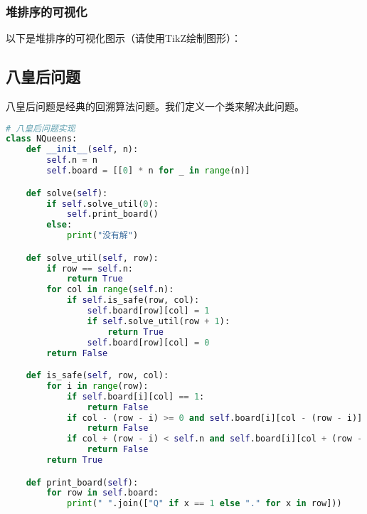 \documentclass{article}
\begin{document}
\subsubsection{堆排序的可视化}
以下是堆排序的可视化图示（请使用TikZ绘制图形）：




\subsection{八皇后问题}
八皇后问题是经典的回溯算法问题。我们定义一个类来解决此问题。

\begin{lstlisting}[language=Python,caption=八皇后问题示例]
# 八皇后问题实现
class NQueens:
    def __init__(self, n):
        self.n = n
        self.board = [[0] * n for _ in range(n)]

    def solve(self):
        if self.solve_util(0):
            self.print_board()
        else:
            print("没有解")

    def solve_util(self, row):
        if row == self.n:
            return True
        for col in range(self.n):
            if self.is_safe(row, col):
                self.board[row][col] = 1
                if self.solve_util(row + 1):
                    return True
                self.board[row][col] = 0
        return False

    def is_safe(self, row, col):
        for i in range(row):
            if self.board[i][col] == 1:
                return False
            if col - (row - i) >= 0 and self.board[i][col - (row - i)] == 1:
                return False
            if col + (row - i) < self.n and self.board[i][col + (row - i)] == 1:
                return False
        return True

    def print_board(self):
        for row in self.board:
            print(" ".join(["Q" if x == 1 else "." for x in row]))
\end{lstlisting}
\end{document}
